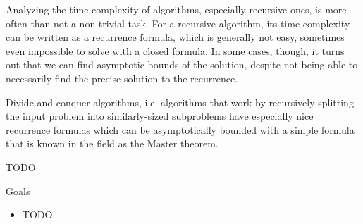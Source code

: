 Analyzing the time complexity of algorithms, especially recursive ones, is more often than not 
a non-trivial task. For a recursive algorithm, its time complexity can be written as a recurrence
formula, which is generally not easy, sometimes even impossible to solve with a closed formula.
In some cases, though, it turns out that we can find asymptotic bounds of the solution, despite not
being able to necessarily find the precise solution to the recurrence.

Divide-and-conquer algorithms, i.e. algorithms that work by recursively splitting the input problem
into similarly-sized subproblems have especially nice recurrence formulas which can be asymptotically
bounded with a simple formula that is known in the field as the Master theorem.

\begin{theorem}
TODO
\end{theorem}

Goals
\begin{itemize}
\item TODO
\end{itemize}

